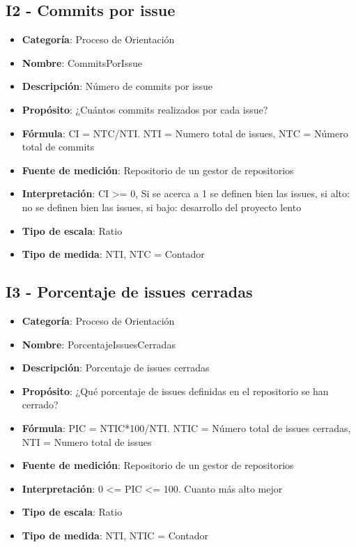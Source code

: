 \subsection{I2 - Commits por issue}
\begin{itemize}
	\item \textbf{Categoría}: Proceso de Orientación
	\item \textbf{Nombre}: CommitsPorIssue
	\item \textbf{Descripción}: Número de commits por issue
	\item \textbf{Propósito}: ¿Cuántos commits realizados por cada issue?
	\item \textbf{Fórmula}: CI = NTC/NTI. NTI = Numero total de issues, NTC = Número total de commits
	\item \textbf{Fuente de medición}: Repositorio de un gestor de repositorios
	\item \textbf{Interpretación}: CI >= 0, Si se acerca a 1 se definen bien las issues, si alto: no se definen bien las issues, si bajo: desarrollo del proyecto lento
	\item \textbf{Tipo de escala}: Ratio 
	\item \textbf{Tipo de medida}: NTI, NTC = Contador
\end{itemize}
\subsection{I3 - Porcentaje de issues cerradas}
\begin{itemize}
	\item \textbf{Categoría}: Proceso de Orientación
	\item \textbf{Nombre}: PorcentajeIssuesCerradas
	\item \textbf{Descripción}: Porcentaje de issues cerradas
	\item \textbf{Propósito}: ¿Qué porcentaje de issues definidas en el repositorio se han cerrado?
	\item \textbf{Fórmula}: PIC = NTIC*100/NTI. NTIC = Número total de issues cerradas, NTI = Numero total de issues
	\item \textbf{Fuente de medición}: Repositorio de un gestor de repositorios
	\item \textbf{Interpretación}: 0 <= PIC <= 100. Cuanto más alto mejor
	\item \textbf{Tipo de escala}: Ratio
	\item \textbf{Tipo de medida}: NTI, NTIC = Contador
\end{itemize}
